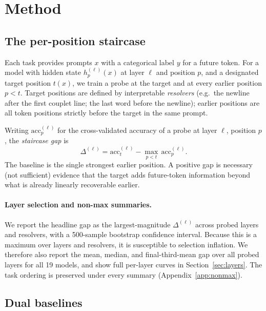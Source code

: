 \documentclass[11pt]{article}
\begin{document}
\section{Method}
\label{sec:method}

\subsection{The per-position staircase}
\label{sec:staircase}

Each task provides prompts $x$ with a categorical label $y$ for a future token.
For a model with hidden state $h^{(\ell)}_p(x)$ at layer $\ell$ and position $p$,
and a designated target position $t(x)$, we train a probe at the target and at
every earlier position $p < t$. Target positions are defined by interpretable
\emph{resolvers} (e.g.\ the newline after the first couplet line; the last word
before the newline); earlier positions are all token positions strictly before the
target in the same prompt.

Writing $\mathrm{acc}^{(\ell)}_p$ for the cross-validated accuracy of a probe at
layer $\ell$, position $p$, the \emph{staircase gap} is
\begin{equation}
\label{eq:gap}
\Delta^{(\ell)} = \mathrm{acc}^{(\ell)}_t - \max_{p < t}\, \mathrm{acc}^{(\ell)}_p.
\end{equation}
The baseline is the single strongest earlier position. A positive gap is
necessary (not sufficient) evidence that the target adds future-token
information beyond what is already linearly recoverable earlier.

\paragraph{Layer selection and non-max summaries.} We report the headline gap as
the largest-magnitude $\Delta^{(\ell)}$ across probed layers and resolvers, with
a 500-sample bootstrap confidence interval. Because this is a maximum over layers
and resolvers, it is susceptible to selection inflation. We therefore also report
the mean, median, and final-third-mean gap over all probed layers for all 19
models, and show full per-layer curves in Section~\ref{sec:layers}. The task
ordering is preserved under every summary (Appendix~\ref{app:nonmax}).

\subsection{Dual baselines}
\label{sec:dual}
\end{document}
